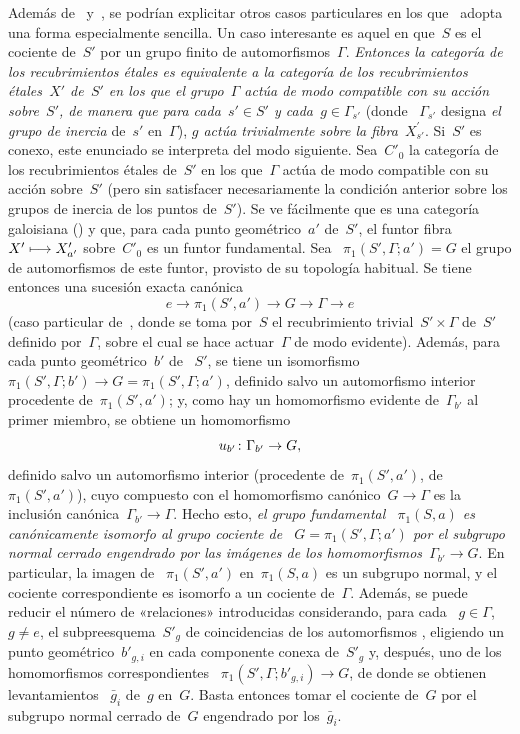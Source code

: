 \begin{remarque}
\label{IX.5.8}
Además de~ y~, se podrían explicitar otros casos
particulares en los que~ adopta una forma especialmente sencilla.
Un caso interesante es aquel en que~$S$ es el cociente de~$S'$ por un grupo
finito de automorfismos~$\Gamma$. \emph{Entonces la categoría de los
recubrimientos étales
es equivalente a la categoría de los recubrimientos étales~$X'$ de~$S'$ en
los que el grupo~$\Gamma$ actúa de modo compatible con su acción sobre~$S'$,
de manera que para cada~$s'\in S'$ y cada~$g\in\Gamma_{s'}$} (donde
~$\Gamma_{s'}$ designa \emph{el grupo de inercia} de~$s'$ en~$\Gamma$),
\emph{$g$ actúa trivialmente sobre la fibra}~$X_{s'}^\prime$. Si~$S'$ es conexo,
este enunciado se interpreta del modo siguiente. Sea~$C'_0$ la categoría de
los recubrimientos étales de~$S'$ en los que~$\Gamma$ actúa de modo compatible
con su acción sobre~$S'$ (pero sin satisfacer necesariamente la condición
anterior sobre los grupos de inercia de los puntos de~$S'$). Se ve fácilmente
que es una categoría galoisiana () y que, para
cada punto geométrico~$a'$ de~$S'$, el funtor fibra
$X'\longmapsto X_{a'}'$ sobre~$C'_0$ es un funtor fundamental. Sea
~$\pi_1(S',\Gamma;a')=G$ el grupo de automorfismos de este funtor, provisto de
su topología habitual. Se tiene entonces una sucesión exacta canónica
$$
e\to \pi_1(S',a')\to G\to \Gamma\to e
$$
(caso particular de~, donde se toma por~$S$ el recubrimiento
trivial~$S'\times\Gamma$ de~$S'$ definido por~$\Gamma$, sobre el cual se hace
actuar~$\Gamma$ de modo evidente). Además, para cada punto geométrico~$b'$ de
~$S'$, se tiene un isomorfismo
$\pi_1(S',\Gamma;b')\to G=\pi_1(S',\Gamma;a')$, definido salvo un
automorfismo interior procedente de~$\pi_1(S',a')$; y, como hay un
homomorfismo evidente de~$\Gamma_{b'}$ al primer miembro, se obtiene un homomorfismo
$$
u_{b'}\colon \Gamma_{b'}\to G ,
$$
definido salvo un automorfismo interior (procedente
{de~$\pi_1(S',a')$,}
{de~$\pi_1(S',a')$),}
cuyo compuesto con el homomorfismo canónico~$G\to\Gamma$ es la inclusión
canónica~$\Gamma_{b'}\to\Gamma$. Hecho esto, \emph{el grupo fundamental
~$\pi_1(S,a)$ es canónicamente isomorfo al grupo cociente de
~$G=\pi_1(S',\Gamma;a')$ por el subgrupo normal cerrado engendrado por las
imágenes de los homomorfismos~$\Gamma_{b'}\to G$}. En particular, la imagen de
~$\pi_1(S',a')$ en~$\pi_1(S,a)$ es un subgrupo normal, y el cociente
correspondiente es isomorfo a un cociente de~$\Gamma$. Además, se puede
reducir el número de «relaciones» introducidas considerando, para cada
~$g\in\Gamma$, $g\neq e$, el subpreesquema~$S'_g$ de coincidencias de los
automorfismos
,
eligiendo un punto geométrico~$b'_{g,i}$ en cada componente conexa de~$S'_g$
y, después, uno de los homomorfismos correspondientes
~$\pi_1(S',\Gamma;b'_{g,i})\to G$, de donde se obtienen levantamientos
~$\bar{g}_i$ de~$g$ en~$G$. Basta entonces tomar el cociente de~$G$ por el
subgrupo normal cerrado de~$G$ engendrado por los~$\bar{g}_i$.


\end{remarque}

